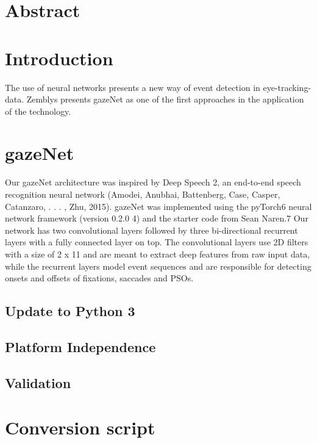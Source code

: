 \documentclass{article}
\begin{document}
\section{Abstract}

\section{Introduction}
The use of neural networks presents a new way of event detection in eye-tracking-data. Zemblys presents gazeNet as one of the first approaches in the application of the technology.

\section{gazeNet}
Our gazeNet architecture was inspired by Deep Speech 2,
an end-to-end speech recognition neural network (Amodei,
Anubhai, Battenberg, Case, Casper, Catanzaro, . . . , Zhu,
2015). gazeNet was implemented using the pyTorch6 neural
network framework (version 0.2.0 4) and the starter code
from Sean Naren.7
Our network has two convolutional layers followed by
three bi-directional recurrent layers with a fully connected
layer on top. The convolutional layers use 2D filters with
a size of 2 x 11 and are meant to extract deep features
from raw input data, while the recurrent layers model event
sequences and are responsible for detecting onsets and
offsets of fixations, saccades and PSOs.
\citet{zemblys2018gazeNet}

\subsection{Update to Python 3}

\subsection{Platform Independence}

\subsection{Validation}

\section{Conversion script}



\end{document}
